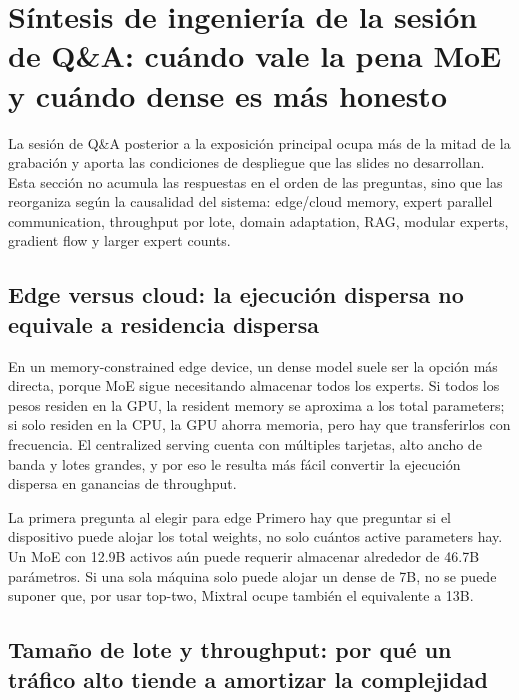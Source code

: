 \section{Síntesis de ingeniería de la sesión de Q\&A: cuándo vale la pena MoE y cuándo dense es más honesto}

La sesión de Q\&A posterior a la exposición principal ocupa más de la mitad de la grabación y aporta las condiciones de despliegue que las slides no desarrollan. Esta sección no acumula las respuestas en el orden de las preguntas, sino que las reorganiza según la causalidad del sistema: edge/cloud memory, expert parallel communication, throughput por lote, domain adaptation, RAG, modular experts, gradient flow y larger expert counts.

\subsection{Edge versus cloud: la ejecución dispersa no equivale a residencia dispersa}

En un memory-constrained edge device, un dense model suele ser la opción más directa, porque MoE sigue necesitando almacenar todos los experts. Si todos los pesos residen en la GPU, la resident memory se aproxima a los total parameters; si solo residen en la CPU, la GPU ahorra memoria, pero hay que transferirlos con frecuencia. El centralized serving cuenta con múltiples tarjetas, alto ancho de banda y lotes grandes, y por eso le resulta más fácil convertir la ejecución dispersa en ganancias de throughput.

\begin{importantbox}{La primera pregunta al elegir para edge}
Primero hay que preguntar si el dispositivo puede alojar los total weights, no solo cuántos active parameters hay. Un MoE con 12.9B activos aún puede requerir almacenar alrededor de 46.7B parámetros. Si una sola máquina solo puede alojar un dense de 7B, no se puede suponer que, por usar top-two, Mixtral ocupe también el equivalente a 13B.
\end{importantbox}


\subsection{Tamaño de lote y throughput: por qué un tráfico alto tiende a amortizar la complejidad}

